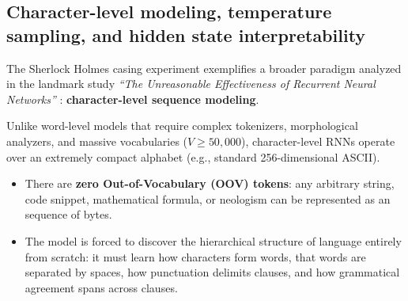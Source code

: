 \documentclass[../../main.tex]{subfiles}
\begin{document}
\subsection{Character-level modeling, temperature sampling, and hidden state interpretability}
\label{sec:karpathy_char_rnn}

The Sherlock Holmes casing experiment exemplifies a broader paradigm analyzed in the landmark study \emph{``The Unreasonable Effectiveness of Recurrent Neural Networks''} \cite{karpathy2015rnn}: \textbf{character-level sequence modeling}.

\medskip

Unlike word-level models that require complex tokenizers, morphological analyzers, and massive vocabularies ($V \ge 50{,}000$), character-level RNNs operate over an extremely compact alphabet (e.g., standard 256-dimensional ASCII). 
\begin{itemize}
    \item There are \textbf{zero Out-of-Vocabulary (OOV) tokens}: any arbitrary string, code snippet, mathematical formula, or neologism can be represented as an sequence of bytes.
    \item The model is forced to discover the hierarchical structure of language entirely from scratch: it must learn how characters form words, that words are separated by spaces, how punctuation delimits clauses, and how grammatical agreement spans across clauses.
\end{itemize}

\medskip
\end{document}
